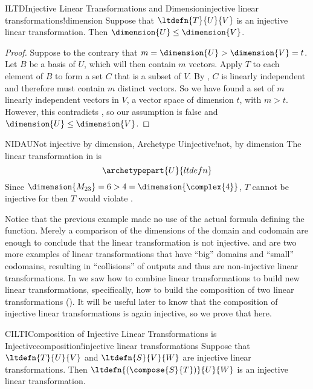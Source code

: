 %
%
\begin{theorem}{ILTD}{Injective Linear Transformations and Dimension}{injective linear transformations!dimension}
Suppose that $\ltdefn{T}{U}{V}$ is an injective linear transformation.  Then $\dimension{U}\leq\dimension{V}$.
\end{theorem}
%
\begin{proof}
%
Suppose to the contrary that $m=\dimension{U}>\dimension{V}=t$.  Let $B$ be  a basis of $U$, which will then contain $m$ vectors.  Apply $T$ to each element of $B$ to form a set $C$ that is a subset of $V$.  By , $C$ is linearly independent and therefore must contain $m$ distinct vectors.  So we have found a set of $m$ linearly independent vectors in $V$, a vector space of dimension $t$, with $m>t$.  However, this contradicts , so our assumption is false and $\dimension{U}\leq\dimension{V}$.
%
\end{proof}
%
\begin{example}{NIDAU}{Not injective by dimension, Archetype U}{injective!not, by dimension}
The linear transformation in  is
%
\begin{equation*}
\archetypepart{U}{ltdefn}
\end{equation*}
%
Since $\dimension{M_{23}}=6>4=\dimension{\complex{4}}$, $T$ cannot be injective for then $T$ would violate .
%
\end{example}
%
Notice that the previous example made no use of the actual formula defining the function.  Merely a comparison of the dimensions of the domain and codomain are enough to conclude that the linear transformation is not injective.   and  are two more examples of linear transformations that have ``big'' domains and ``small'' codomains, resulting in ``collisions'' of outputs and thus are non-injective linear transformations.
%
%
In  we saw how to combine linear transformations to build new linear transformations, specifically, how to build the composition of two linear transformations ().  It will be useful later to know that the composition of injective linear transformations is again injective, so we prove that here.
%
\begin{theorem}{CILTI}{Composition of Injective Linear Transformations is Injective}{composition!injective linear transformations}
Suppose that $\ltdefn{T}{U}{V}$ and $\ltdefn{S}{V}{W}$ are injective linear transformations.  Then $\ltdefn{(\compose{S}{T})}{U}{W}$ is an injective linear transformation.
\end{theorem}

